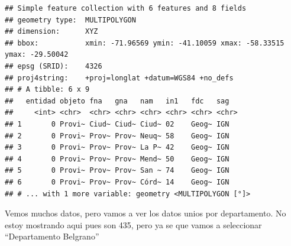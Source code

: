 \documentclass[]{book}
\newenvironment{Shaded}{\begin{snugshade}}{\end{snugshade}}
\newcommand{\KeywordTok}[1]{\textcolor[rgb]{0.13,0.29,0.53}{\textbf{#1}}}
\newcommand{\NormalTok}[1]{#1}
\newcommand{\OperatorTok}[1]{\textcolor[rgb]{0.81,0.36,0.00}{\textbf{#1}}}
\begin{document}
\begin{verbatim}
## Simple feature collection with 6 features and 8 fields
## geometry type:  MULTIPOLYGON
## dimension:      XYZ
## bbox:           xmin: -71.96569 ymin: -41.10059 xmax: -58.33515 ymax: -29.50042
## epsg (SRID):    4326
## proj4string:    +proj=longlat +datum=WGS84 +no_defs
## # A tibble: 6 x 9
##   entidad objeto fna   gna   nam   in1   fdc   sag  
##     <int> <chr>  <chr> <chr> <chr> <chr> <chr> <chr>
## 1       0 Provi~ Ciud~ Ciud~ Ciud~ 02    Geog~ IGN  
## 2       0 Provi~ Prov~ Prov~ Neuq~ 58    Geog~ IGN  
## 3       0 Provi~ Prov~ Prov~ La P~ 42    Geog~ IGN  
## 4       0 Provi~ Prov~ Prov~ Mend~ 50    Geog~ IGN  
## 5       0 Provi~ Prov~ Prov~ San ~ 74    Geog~ IGN  
## 6       0 Provi~ Prov~ Prov~ Córd~ 14    Geog~ IGN  
## # ... with 1 more variable: geometry <MULTIPOLYGON [°]>
\end{verbatim}

Vemos muchos datos, pero vamos a ver los datos unios por departamento. No estoy mostrando aqui pues son 435, pero ya se que vamos a seleccionar ``Departamento Belgrano''

\begin{Shaded}
\end{Shaded}
\end{document}
